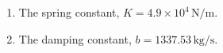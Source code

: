 \documentclass{article}
\begin{document}
\section*{}

\begin{enumerate}[label=\textbf{Part-\alph*:}]
    \item The spring constant, \(K = 4.9 \times 10^4\, \text{N/m}\).
    \item The damping constant, \(b = 1337.53\, \text{kg/s}\).
\end{enumerate}
\end{document}
